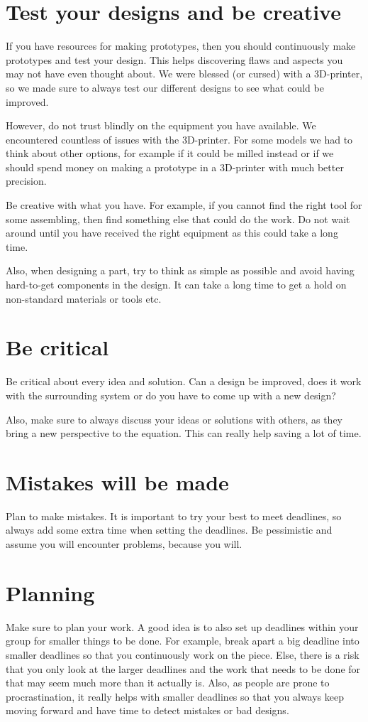 \documentclass[11pt,a4paper]{amsart}
\begin{document}
\begin{multicols}{2}
\section{\bf{Test your designs and be creative}}
If you have resources for making prototypes, then you should continuously make prototypes and test your design. This helps discovering flaws and aspects you may not have even thought about. 
We were blessed (or cursed) with a 3D-printer, so we made sure to always test our different designs to see what could be improved. 

However, do not trust blindly on the equipment you have available. We encountered countless of issues with the 3D-printer. For some models we had to think about other options, for example if it could be milled instead or if we should spend money on making a prototype in a 3D-printer with much better precision. 

Be creative with what you have. For example, if you cannot find the right tool for some assembling, then find something else that could do the work. Do not wait around until you have received the right equipment as this could take a long time. 

Also, when designing a part, try to think as simple as possible and avoid having hard-to-get components in the design. It can take a long time to get a hold on non-standard materials or tools etc.

\section{\bf{Be critical}}
\noindent Be critical about every idea and solution. Can a design be improved, does it work with the surrounding system or do you have to come up with a new design? 

Also, make sure to always discuss your ideas or solutions with others, as they bring a new perspective to the equation. This can really help saving a lot of time. 

\section{\bf{Mistakes will be made}}
\noindent Plan to make mistakes. It is important to try your best to meet deadlines, so always add some extra time when setting the deadlines. Be pessimistic and assume you will encounter problems, because you will. 

\section{\bf{Planning}}
\noindent Make sure to plan your work. A good idea is to also set up deadlines within your group for smaller things to be done. For example, break apart a big deadline into smaller deadlines so that you continuously work on the piece. Else, there is a risk that you only look at the larger deadlines and the work that needs to be done for that may seem much more than it actually is. Also, as people are prone to procrastination, it really helps with smaller deadlines so that you always keep moving forward and have time to detect mistakes or bad designs. 


\end{multicols}
\end{document}

